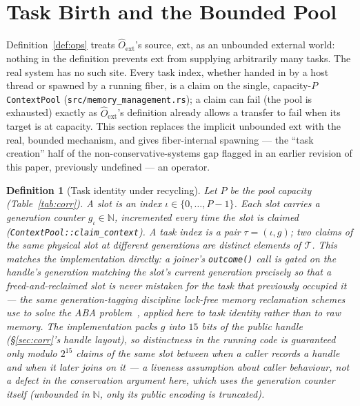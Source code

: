 \documentclass[11pt,a4paper]{report}
\newtheorem{definition}{Definition}[section]
\newcommand{\code}[1]{\texttt{#1}}
\begin{document}
\section{Task Birth and the Bounded Pool}
\label{sec:birth}

Definition~\ref{def:ops} treats $\hat{O}_{\text{ext}}$'s source,
$\text{ext}$, as an unbounded external world: nothing in the
definition prevents $\text{ext}$ from supplying arbitrarily many
tasks. The real system has no such site. Every task index, whether
handed in by a host thread or spawned by a running fiber, is a claim
on the single, capacity-$P$ \code{ContextPool} (\code{src/memory\_management.rs}); a
claim can fail (the pool is exhausted) exactly as $\hat{O}_{\text{ext}}$'s
definition already allows a transfer to fail when its target is at
capacity. This section replaces the implicit unbounded $\text{ext}$
with the real, bounded mechanism, and gives fiber-internal spawning
--- the ``task creation'' half of the non-conservative-systems gap
flagged in an earlier revision of this paper, previously undefined
--- an operator.

\begin{definition}[Task identity under recycling]
\label{def:task-identity}
Let $P$ be the pool capacity (Table~\ref{tab:corr}). A \emph{slot} is
an index $\iota \in \{0, \ldots, P-1\}$. Each slot carries a
\emph{generation counter} $g_\iota \in \mathbb{N}$, incremented every
time the slot is claimed (\code{ContextPool::claim\_context}). A
\emph{task index} is a pair $\tau = (\iota, g)$; two claims of the
same physical slot at different generations are distinct elements of
$\mathcal{T}$. This matches the implementation directly: a joiner's
\code{outcome()} call is gated on the handle's generation matching the
slot's current generation precisely so that a freed-and-reclaimed slot
is never mistaken for the task that previously occupied it --- the
same generation-tagging discipline lock-free memory reclamation
schemes use to solve the ABA problem~\cite{michael2004}, applied here
to task identity rather than to raw memory. The
implementation packs $g$ into $15$ bits of the public handle
(\S\ref{sec:corr}'s handle layout), so distinctness in the running
code is guaranteed only modulo $2^{15}$ claims of the same slot
between when a caller records a handle and when it later joins on it
--- a liveness assumption about caller behaviour, not a defect in the
conservation argument here, which uses the generation counter itself
(unbounded in $\mathbb{N}$, only its public encoding is truncated).
\end{definition}
\end{document}
